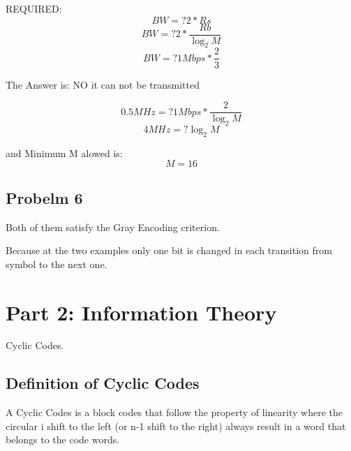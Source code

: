 \documentclass[a4paper,12pt]{report}
\begin{document}
        REQUIRED:
        \begin{equation*}
            BW =? 2 * Rs
        \end{equation*}
        \begin{equation*}
            BW =? 2 * \frac{Rb}{\log_2 M}
        \end{equation*}
        \begin{equation*}
            BW =? 1Mbps * \frac{2}{3}
        \end{equation*}

        The Answer is: NO it can not be transmitted
        
        \begin{equation*}
            0.5MHz =? 1Mbps * \frac{2}{\log_2 M}
        \end{equation*}
        \begin{equation*}
            4MHz =? \log_2 M
        \end{equation*}

        and Minimum M alowed is:
        \begin{equation*}
            M = 16
        \end{equation*}
        
    \subsection{Probelm 6}
        Both of them satisfy the Gray Encoding criterion.

        Because at the two examples only one bit is changed in each transition from symbol to the next one.

    \newpage

    \section{Part 2: Information Theory}
        Cyclic Codes.
    \subsection{Definition of Cyclic Codes}
    A Cyclic Codes is a block codes that follow the property of linearity
    where the circular i shift to the left (or n-1 shift to the right) always
    result in a word that belongs to the code words.
    
\end{document}
